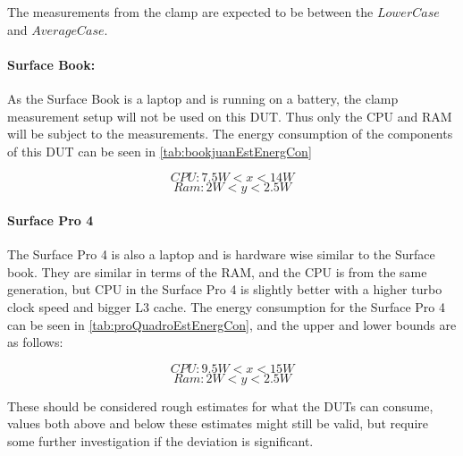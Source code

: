 The measurements from the clamp are expected to be between the $LowerCase$ and $AverageCase$.

\paragraph{Surface Book:} As the Surface Book is a laptop and is running on a battery, the clamp measurement setup will not be used on this DUT. Thus only the CPU and RAM will be subject to the measurements. The energy consumption of the components of this DUT can be seen in \cref*{tab:bookjuanEstEnergCon}

$$CPU: 7.5W < x < 14W $$
$$Ram: 2W < y < 2.5W $$



\paragraph{Surface Pro 4} The Surface Pro 4 is also a laptop and is hardware wise similar to the Surface book. They are similar in terms of the RAM, and the CPU is from the same generation, but CPU in the Surface Pro 4 is slightly better with a higher turbo clock speed and bigger L3 cache. The energy consumption for the Surface Pro 4 can be seen in \cref{tab:proQuadroEstEnergCon}, and the upper and lower bounds are as follows:

$$CPU: 9.5W < x < 15W $$
$$Ram: 2W < y < 2.5W $$



These should be considered rough estimates for what the DUTs can consume, values both above and below these estimates might still be valid, but require some further investigation if the deviation is significant.